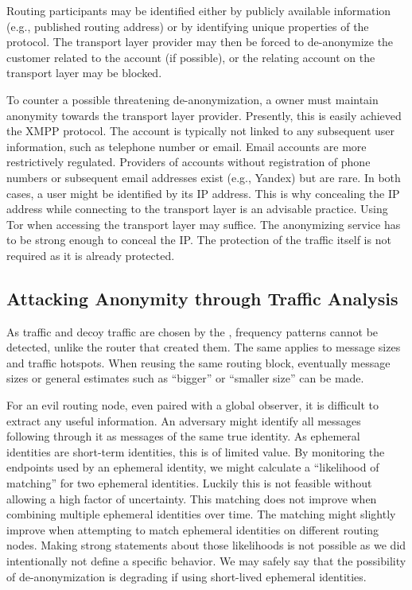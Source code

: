 Routing participants may be identified either by publicly available information (e.g., published routing address) or by identifying unique properties of the protocol. The transport layer provider may then be forced to de-anonymize the customer related to the account (if possible), or the relating account on the transport layer may be blocked. 

To counter a possible threatening de-anonymization, a \VortexNode{} owner must maintain anonymity towards the transport layer provider. Presently, this is easily achieved the XMPP protocol. The account is typically not linked to any subsequent user information, such as telephone number or email. Email accounts are more restrictively regulated. Providers of accounts without registration of phone numbers or subsequent email addresses exist (e.g., Yandex) but are rare. In both cases, a user might be identified by its IP address. This is why concealing the IP address while connecting to the transport layer is an advisable practice. Using Tor when accessing the transport layer may suffice. The anonymizing service has to be strong enough to conceal the IP. The protection of the traffic itself is not required as it is already protected.

\subsection{Attacking Anonymity through Traffic Analysis}
As traffic and decoy traffic are chosen by the , frequency patterns cannot be detected, unlike the router that created them. The same applies to message sizes and traffic hotspots. When reusing the same routing block, eventually message sizes or general estimates such as ``bigger'' or ``smaller size'' can be made.

For an evil routing node, even paired with a global observer, it is difficult to extract any useful information. An adversary might identify all messages following through it as messages of the same true identity. As ephemeral identities are short-term identities, this is of limited value. By monitoring the endpoints used by an ephemeral identity, we might calculate a ``likelihood of matching'' for two ephemeral identities. Luckily this is not feasible without allowing a high factor of uncertainty. This matching does not improve when combining multiple ephemeral identities over time. The matching might slightly improve when attempting to match ephemeral identities on different routing nodes. Making strong statements about those likelihoods is not possible as we did intentionally not define a specific behavior. We may safely say that the possibility of de-anonymization is degrading if using short-lived ephemeral identities.

